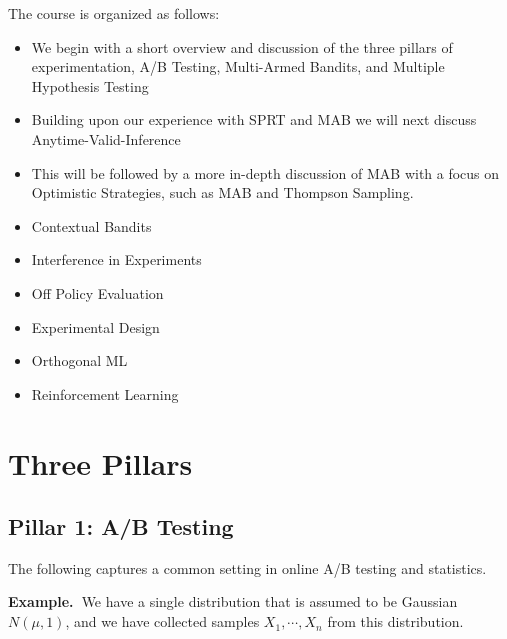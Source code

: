 \documentclass[11pt]{article}
\newcommand{\example}{\noindent\textbf{Example.\  }}
\newcommand{\1}[1]{\mathbf{1}\left\{#1\right\}}
\begin{document}
The course is organized as follows:
\begin{itemize}
    \item We begin with a short overview and discussion of the three pillars of experimentation, A/B Testing, Multi-Armed Bandits, and Multiple Hypothesis Testing
    \item Building upon our experience with SPRT and MAB we will next discuss Anytime-Valid-Inference
    \item This will be followed by a more in-depth discussion of MAB with a focus on Optimistic Strategies, such as MAB and Thompson Sampling. 
    \item Contextual Bandits
    \item Interference in Experiments
    \item Off Policy Evaluation
    \item Experimental Design
    \item Orthogonal ML
    \item Reinforcement Learning
\end{itemize}

\section{Three Pillars}

\subsection{Pillar 1: A/B Testing}
The following captures a common setting in online A/B testing and statistics.

\example We have a single distribution that is assumed to be Gaussian $N(\mu,1)$, and we have collected samples $X_1, \cdots, X_n$ from this distribution. 
\end{document}
